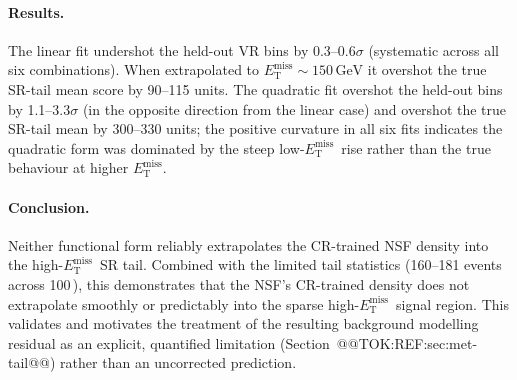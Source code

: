 \documentclass[11pt]{article}
\newcommand{\GeV}{\text{GeV}}
\newcommand{\MET}{\ensuremath{E_{\mathrm{T}}^{\mathrm{miss}}}}
\begin{document}
\paragraph{Results.}
The linear fit undershot the held-out VR bins by 0.3--0.6$\sigma$
(systematic across all six combinations). When extrapolated to
$\MET\sim150\,\GeV$ it overshot the true SR-tail mean score by 90--115
units. The quadratic fit overshot the held-out bins by 1.1--3.3$\sigma$
(in the opposite direction from the linear case) and overshot the true
SR-tail mean by 300--330 units; the positive curvature in all six fits
indicates the quadratic form was dominated by the steep low-\MET\ rise
rather than the true behaviour at higher \MET.

\paragraph{Conclusion.}
Neither functional form reliably extrapolates the CR-trained NSF
density into the high-\MET\ SR tail. Combined with the limited tail
statistics (160--181 events across 100\,\GeV), this demonstrates that
the NSF's CR-trained density does not extrapolate smoothly or
predictably into the sparse high-\MET\ signal region. This validates
and motivates the treatment of the resulting background modelling
residual as an explicit, quantified limitation
(Section~@@TOK:REF:sec:met-tail@@) rather than an uncorrected prediction.

\end{document}

